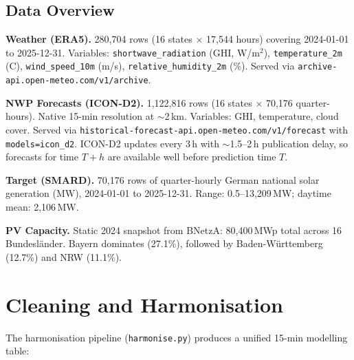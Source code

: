 \documentclass[11pt,a4paper]{article}
\begin{document}
\subsection{Data Overview}

\textbf{Weather (ERA5).}
280,704 rows (16 states $\times$ 17,544 hours) covering 2024-01-01 to 2025-12-31.
Variables: \texttt{shortwave\_radiation} (GHI, W/m$^2$), \texttt{temperature\_2m} (\textdegree C), \texttt{wind\_speed\_10m} (m/s), \texttt{relative\_humidity\_2m} (\%).
Served via \texttt{archive-api.open-meteo.com/v1/archive}.

\textbf{NWP Forecasts (ICON-D2).}
1,122,816 rows (16 states $\times$ 70,176 quarter-hours).
Native 15-min resolution at ${\sim}$2\,km.
Variables: GHI, temperature, cloud cover.
Served via \texttt{historical-forecast-api.open-meteo.com/v1/forecast} with \texttt{models=icon\_d2}.
ICON-D2 updates every 3\,h with ${\sim}$1.5--2\,h publication delay, so forecasts for time $T{+}h$ are available well before prediction time $T$.

\textbf{Target (SMARD).}
70,176 rows of quarter-hourly German national solar generation (MW), 2024-01-01 to 2025-12-31.
Range: 0.5--13,209\,MW; daytime mean: 2,106\,MW.

\textbf{PV Capacity.}
Static 2024 snapshot from BNetzA: 80,400\,MWp total across 16 Bundesl\"ander.
Bayern dominates (27.1\%), followed by Baden-W\"urttemberg (12.7\%) and NRW (11.1\%).

\section{Cleaning and Harmonisation}

The harmonisation pipeline (\texttt{harmonise.py}) produces a unified 15-min modelling table:
\end{document}
